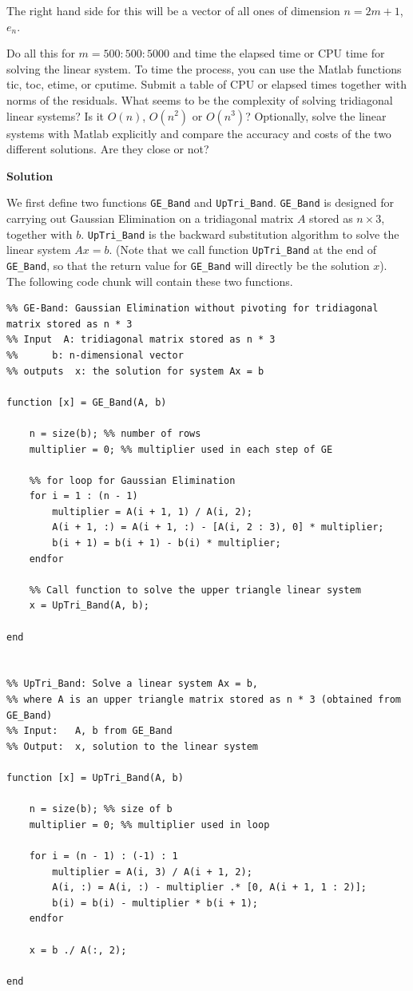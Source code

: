 \documentclass[12pt,oneside,a4paper]{article}
\newcommand{\solution}
{
    \vspace{15pt}
    \noindent\ignorespaces\textbf{\large Solution}\par
}
\newcommand{\m}[1]{\texttt{{#1}}}
\begin{document}
The right hand side for this will be a vector of all ones of dimension $n = 2m + 1$, $e_{n}$.

Do all this for $m = 500 : 500 : 5000$ and time the elapsed time or CPU time for solving the linear system. To time the process, you can use the Matlab functions tic, toc, etime, or cputime. Submit a table of CPU or elapsed times together with norms of the residuals. What seems to be the complexity of solving tridiagonal linear systems? Is it $O(n)$, $O(n^2)$ or $O(n^3)$? Optionally, solve the linear systems with Matlab explicitly and compare the accuracy and costs of the two different solutions. Are they close or not?

\solution
We first define two functions \m{GE\_Band} and \m{UpTri\_Band}. \m{GE\_Band} is designed for carrying out Gaussian Elimination on a tridiagonal matrix $A$ stored as $n\times 3$, together with $b$. \m{UpTri\_Band} is the backward substitution algorithm to solve the linear system $Ax = b$. (Note that we call function \m{UpTri\_Band} at the end of \m{GE\_Band}, so that the return value for \m{GE\_Band} will directly be the solution $x$). The following code chunk will contain these two functions.

\begin{lstlisting}
%% GE-Band: Gaussian Elimination without pivoting for tridiagonal matrix stored as n * 3
%% Input  A: tridiagonal matrix stored as n * 3
%%      b: n-dimensional vector
%% outputs  x: the solution for system Ax = b

function [x] = GE_Band(A, b)

    n = size(b); %% number of rows
    multiplier = 0; %% multiplier used in each step of GE

    %% for loop for Gaussian Elimination
    for i = 1 : (n - 1)
        multiplier = A(i + 1, 1) / A(i, 2);
        A(i + 1, :) = A(i + 1, :) - [A(i, 2 : 3), 0] * multiplier;
        b(i + 1) = b(i + 1) - b(i) * multiplier;
    endfor
    
    %% Call function to solve the upper triangle linear system
    x = UpTri_Band(A, b);

end


%% UpTri_Band: Solve a linear system Ax = b, 
%% where A is an upper triangle matrix stored as n * 3 (obtained from GE_Band)
%% Input:   A, b from GE_Band
%% Output:  x, solution to the linear system

function [x] = UpTri_Band(A, b)

    n = size(b); %% size of b
    multiplier = 0; %% multiplier used in loop

    for i = (n - 1) : (-1) : 1
        multiplier = A(i, 3) / A(i + 1, 2);
        A(i, :) = A(i, :) - multiplier .* [0, A(i + 1, 1 : 2)];
        b(i) = b(i) - multiplier * b(i + 1);
    endfor

    x = b ./ A(:, 2);

end
\end{lstlisting}
\end{document}
